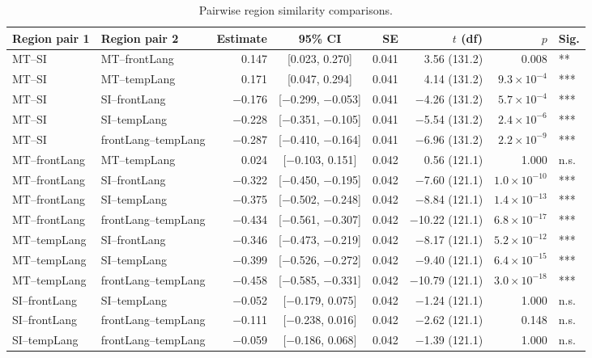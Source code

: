 \begin{table}[h]
\centering
\begin{tabular}{llrcrrrl}
\toprule
Region pair 1 & Region pair 2 & Estimate & 95\% CI & SE & $t$ (df) & $p$ & Sig. \\
\midrule
MT--SI & MT--frontLang & 0.147 & [0.023, 0.270] & 0.041 & 3.56 (131.2) & 0.008 & ** \\
MT--SI & MT--tempLang & 0.171 & [0.047, 0.294] & 0.041 & 4.14 (131.2) & $9.3\times10^{-4}$ & *** \\
MT--SI & SI--frontLang & $-$0.176 & [$-$0.299, $-$0.053] & 0.041 & $-$4.26 (131.2) & $5.7\times10^{-4}$ & *** \\
MT--SI & SI--tempLang & $-$0.228 & [$-$0.351, $-$0.105] & 0.041 & $-$5.54 (131.2) & $2.4\times10^{-6}$ & *** \\
MT--SI & frontLang--tempLang & $-$0.287 & [$-$0.410, $-$0.164] & 0.041 & $-$6.96 (131.2) & $2.2\times10^{-9}$ & *** \\
MT--frontLang & MT--tempLang & 0.024 & [$-$0.103, 0.151] & 0.042 & 0.56 (121.1) & 1.000 & n.s. \\
MT--frontLang & SI--frontLang & $-$0.322 & [$-$0.450, $-$0.195] & 0.042 & $-$7.60 (121.1) & $1.0\times10^{-10}$ & *** \\
MT--frontLang & SI--tempLang & $-$0.375 & [$-$0.502, $-$0.248] & 0.042 & $-$8.84 (121.1) & $1.4\times10^{-13}$ & *** \\
MT--frontLang & frontLang--tempLang & $-$0.434 & [$-$0.561, $-$0.307] & 0.042 & $-$10.22 (121.1) & $6.8\times10^{-17}$ & *** \\
MT--tempLang & SI--frontLang & $-$0.346 & [$-$0.473, $-$0.219] & 0.042 & $-$8.17 (121.1) & $5.2\times10^{-12}$ & *** \\
MT--tempLang & SI--tempLang & $-$0.399 & [$-$0.526, $-$0.272] & 0.042 & $-$9.40 (121.1) & $6.4\times10^{-15}$ & *** \\
MT--tempLang & frontLang--tempLang & $-$0.458 & [$-$0.585, $-$0.331] & 0.042 & $-$10.79 (121.1) & $3.0\times10^{-18}$ & *** \\
SI--frontLang & SI--tempLang & $-$0.052 & [$-$0.179, 0.075] & 0.042 & $-$1.24 (121.1) & 1.000 & n.s. \\
SI--frontLang & frontLang--tempLang & $-$0.111 & [$-$0.238, 0.016] & 0.042 & $-$2.62 (121.1) & 0.148 & n.s. \\
SI--tempLang & frontLang--tempLang & $-$0.059 & [$-$0.186, 0.068] & 0.042 & $-$1.39 (121.1) & 1.000 & n.s. \\
\bottomrule
\end{tabular}
\caption{Pairwise region similarity comparisons.}
\end{table}
